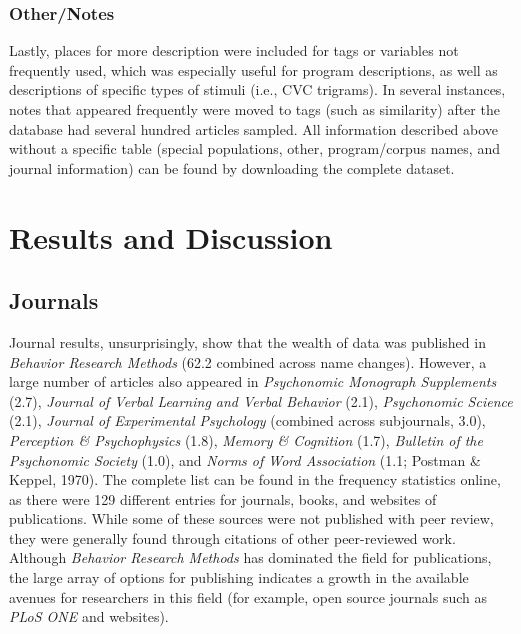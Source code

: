 \documentclass[english,man]{apa6}
\theoremstyle{definition}
\theoremstyle{definition}
\theoremstyle{definition}
\theoremstyle{remark}
\begin{document}
\subsubsection{Other/Notes}\label{othernotes}

Lastly, places for more description were included for tags or variables
not frequently used, which was especially useful for program
descriptions, as well as descriptions of specific types of stimuli
(i.e., CVC trigrams). In several instances, notes that appeared
frequently were moved to tags (such as similarity) after the database
had several hundred articles sampled. All information described above
without a specific table (special populations, other, program/corpus
names, and journal information) can be found by downloading the complete
dataset.

\section{Results and Discussion}\label{results-and-discussion}

\subsection{Journals}\label{journals}

Journal results, unsurprisingly, show that the wealth of data was
published in \emph{Behavior Research Methods} (62.2 combined across name
changes). However, a large number of articles also appeared in
\emph{Psychonomic Monograph Supplements} (2.7), \emph{Journal of Verbal
Learning and Verbal Behavior} (2.1), \emph{Psychonomic Science} (2.1),
\emph{Journal of Experimental Psychology} (combined across subjournals,
3.0), \emph{Perception \& Psychophysics} (1.8), \emph{Memory \&
Cognition} (1.7), \emph{Bulletin of the Psychonomic Society} (1.0), and
\emph{Norms of Word Association} (1.1; Postman \& Keppel, 1970). The
complete list can be found in the frequency statistics online, as there
were 129 different entries for journals, books, and websites of
publications. While some of these sources were not published with peer
review, they were generally found through citations of other
peer-reviewed work. Although \emph{Behavior Research Methods} has
dominated the field for publications, the large array of options for
publishing indicates a growth in the available avenues for researchers
in this field (for example, open source journals such as \emph{PLoS ONE}
and websites).
\end{document}
